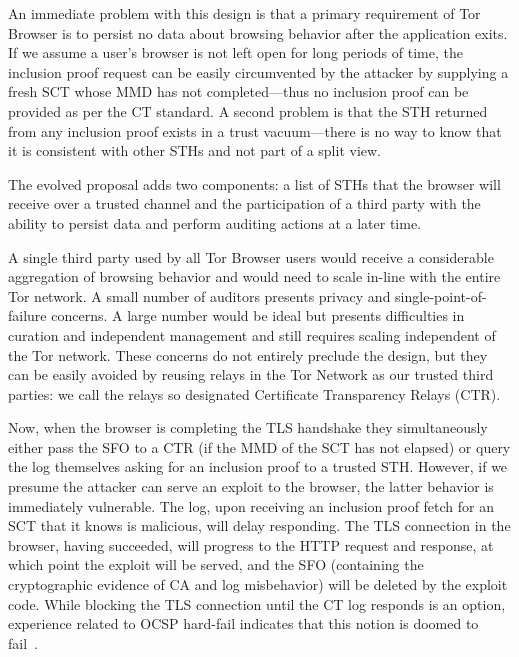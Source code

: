 An immediate problem with this design is that a primary requirement of Tor
Browser is to persist no data about browsing behavior after the application
exits. If we assume a user's browser is not left open for long periods of time,
the inclusion proof request can be easily circumvented by the attacker by
supplying a fresh SCT whose MMD has not completed---thus no inclusion proof can
be provided as per the CT standard. A second problem is that the STH returned
from any inclusion proof exists in a trust vacuum---there is no way to know that
it is consistent with other STHs and not part of a split view.

The evolved proposal adds two components: a list of STHs that the browser will
receive over a trusted channel and the participation of a third party with the
ability to persist data and perform auditing actions at a later time.

A single third party used by all Tor Browser users would receive a considerable
aggregation of browsing behavior and would need to scale in-line with the entire
Tor network. A small number of auditors presents privacy and
single-point-of-failure concerns. A large number would be ideal but presents
difficulties in curation and independent management and still requires scaling
independent of the Tor network. These concerns do not entirely preclude the
design, but they can be easily avoided by reusing relays in the Tor Network as
our trusted third parties: we call the relays so designated Certificate
Transparency Relays (CTR).

Now, when the browser is completing the TLS handshake they simultaneously either
pass the SFO to a CTR (if the MMD of the SCT has not elapsed) or query the log
themselves asking for an inclusion proof to a trusted STH\@.  However, if we
presume the attacker can serve an exploit to the browser, the latter behavior is
immediately vulnerable. The log, upon receiving an inclusion proof fetch for an
SCT that it knows is malicious, will delay responding. The TLS connection in the
browser, having succeeded, will progress to the HTTP request and response, at
which point the exploit will be served, and the SFO (containing the
cryptographic evidence of CA and log misbehavior) will be deleted by the exploit
code. While blocking the TLS connection until the CT log responds is an option,
experience related to OCSP hard-fail indicates that this notion is doomed to
fail~\cite{no-hard-fail}.

